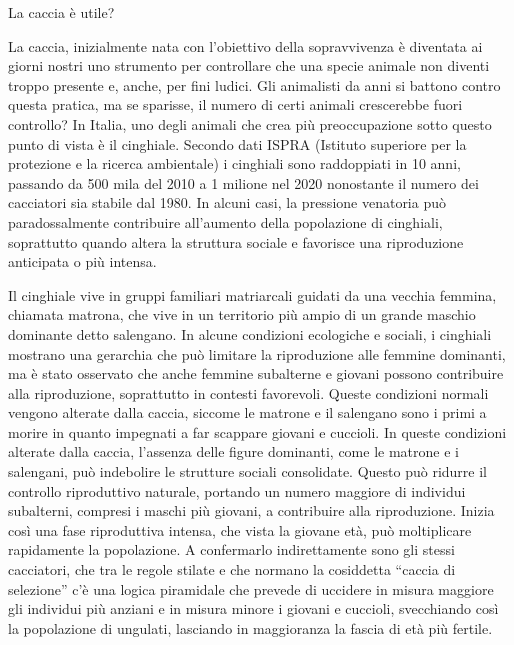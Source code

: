 \documentclass[12pt]{book} %
\begin{document}
\begin{mdframed}[linewidth=1pt]
La caccia è utile?

La caccia, inizialmente nata con l'obiettivo della sopravvivenza è diventata ai giorni nostri uno
strumento per controllare che una specie animale non diventi troppo presente e, anche, per fini ludici. Gli animalisti
da anni si battono contro questa pratica, ma se sparisse, il numero di certi animali crescerebbe fuori controllo? In
Italia, uno degli animali che crea più preoccupazione sotto questo punto di vista è il cinghiale. Secondo
dati ISPRA (Istituto superiore per la protezione e la ricerca ambientale) i cinghiali sono raddoppiati in 10 anni,
passando da 500 mila del 2010 a 1 milione nel 2020 nonostante il numero dei cacciatori sia stabile dal
1980. In alcuni casi, la pressione venatoria può paradossalmente contribuire all’aumento della popolazione di cinghiali, soprattutto quando altera la struttura sociale e favorisce una riproduzione anticipata o più intensa.

Il cinghiale vive in gruppi familiari matriarcali guidati da una vecchia femmina, chiamata matrona, che vive in un
territorio più ampio di un grande maschio dominante detto salengano. In alcune condizioni ecologiche e sociali, i cinghiali mostrano una gerarchia che può limitare la riproduzione alle femmine dominanti, ma è stato osservato che anche femmine subalterne e giovani possono contribuire alla riproduzione, soprattutto in contesti favorevoli.
Queste condizioni normali vengono alterate dalla caccia, siccome le matrone e il salengano sono i primi a morire in
quanto impegnati a far scappare giovani e cuccioli. In queste condizioni alterate dalla caccia, l'assenza delle figure dominanti, come le matrone e i salengani, può indebolire le strutture sociali consolidate. Questo può ridurre il controllo riproduttivo naturale, portando un numero maggiore di individui subalterni, compresi i maschi più giovani, a contribuire alla riproduzione. Inizia così una fase
riproduttiva intensa, che vista la giovane età, può moltiplicare rapidamente la popolazione. 
A confermarlo indirettamente sono gli stessi cacciatori, che tra le regole stilate e che normano la
cosiddetta “caccia di selezione” c'è una logica piramidale che prevede di uccidere in misura maggiore gli individui più
anziani e in misura minore i giovani e cuccioli, svecchiando così la popolazione di ungulati, lasciando in maggioranza
la fascia di età più fertile.


\end{mdframed}
\end{document}
